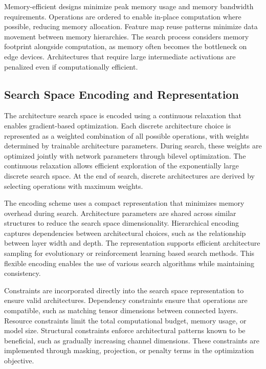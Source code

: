 \documentclass[journal]{IEEEtran}
\begin{document}
Memory-efficient designs minimize peak memory usage and memory bandwidth requirements. Operations are ordered to enable in-place computation where possible, reducing memory allocation. Feature map reuse patterns minimize data movement between memory hierarchies. The search process considers memory footprint alongside computation, as memory often becomes the bottleneck on edge devices. Architectures that require large intermediate activations are penalized even if computationally efficient.

\subsection{Search Space Encoding and Representation}

The architecture search space is encoded using a continuous relaxation that enables gradient-based optimization. Each discrete architecture choice is represented as a weighted combination of all possible operations, with weights determined by trainable architecture parameters. During search, these weights are optimized jointly with network parameters through bilevel optimization. The continuous relaxation allows efficient exploration of the exponentially large discrete search space. At the end of search, discrete architectures are derived by selecting operations with maximum weights.

The encoding scheme uses a compact representation that minimizes memory overhead during search. Architecture parameters are shared across similar structures to reduce the search space dimensionality. Hierarchical encoding captures dependencies between architectural choices, such as the relationship between layer width and depth. The representation supports efficient architecture sampling for evolutionary or reinforcement learning based search methods. This flexible encoding enables the use of various search algorithms while maintaining consistency.

Constraints are incorporated directly into the search space representation to ensure valid architectures. Dependency constraints ensure that operations are compatible, such as matching tensor dimensions between connected layers. Resource constraints limit the total computational budget, memory usage, or model size. Structural constraints enforce architectural patterns known to be beneficial, such as gradually increasing channel dimensions. These constraints are implemented through masking, projection, or penalty terms in the optimization objective.
\end{document}
